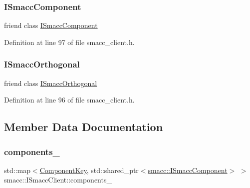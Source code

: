 \subsubsection{\texorpdfstring{I\+Smacc\+Component}{ISmaccComponent}}
{\footnotesize\ttfamily friend class \hyperlink{classsmacc_1_1ISmaccComponent}{I\+Smacc\+Component}\hspace{0.3cm}{\ttfamily [friend]}}



Definition at line 97 of file smacc\+\_\+client.\+h.

\mbox{\label{classsmacc_1_1ISmaccClient_a7205cc84a71fea903124d54d01e99a68}} 
\subsubsection{\texorpdfstring{I\+Smacc\+Orthogonal}{ISmaccOrthogonal}}
{\footnotesize\ttfamily friend class \hyperlink{classsmacc_1_1ISmaccOrthogonal}{I\+Smacc\+Orthogonal}\hspace{0.3cm}{\ttfamily [friend]}}



Definition at line 96 of file smacc\+\_\+client.\+h.



\subsection{Member Data Documentation}
\mbox{\label{classsmacc_1_1ISmaccClient_a9e670e9071bb549dbeb08985d0114afe}} 
\subsubsection{\texorpdfstring{components\+\_\+}{components\_}}
{\footnotesize\ttfamily std\+::map$<$\hyperlink{structsmacc_1_1ComponentKey}{Component\+Key}, std\+::shared\+\_\+ptr$<$\hyperlink{classsmacc_1_1ISmaccComponent}{smacc\+::\+I\+Smacc\+Component}$>$ $>$ smacc\+::\+I\+Smacc\+Client\+::components\+\_\+\hspace{0.3cm}{\ttfamily [protected]}}



